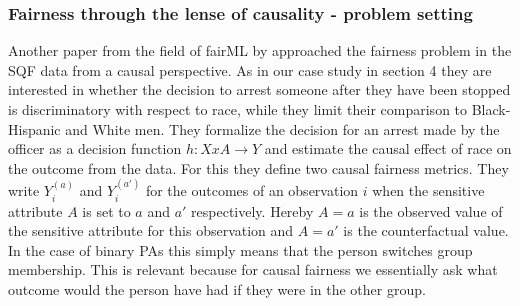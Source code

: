 \subsubsection*{Fairness through the lense of causality - problem setting}
Another paper from the field of fairML by \cite{Khademi2019FADMELC} approached the fairness problem in the SQF data from a causal perspective. As in our case study in section 4 they are interested in whether the decision to arrest someone after they have been stopped is discriminatory with respect to race, while they limit their comparison to Black-Hispanic and White men. They formalize the decision for an arrest made by the officer as a decision function $h: X x A \rightarrow Y$ and estimate the causal effect of race on the outcome from the data. For this they define two causal fairness metrics.
They write $Y_i^{(a)}$ and $Y_i^{(a')}$ for the outcomes of an observation $i$ when the sensitive attribute $A$ is set to $a$ and $a'$ respectively. Hereby $A = a$ is the observed value of the sensitive attribute for this observation and $A = a'$ is the counterfactual value. In the case of binary PAs this simply means that the person switches group membership. This is relevant because for causal fairness we essentially ask what outcome would the person have had if they were in the other group.\\


